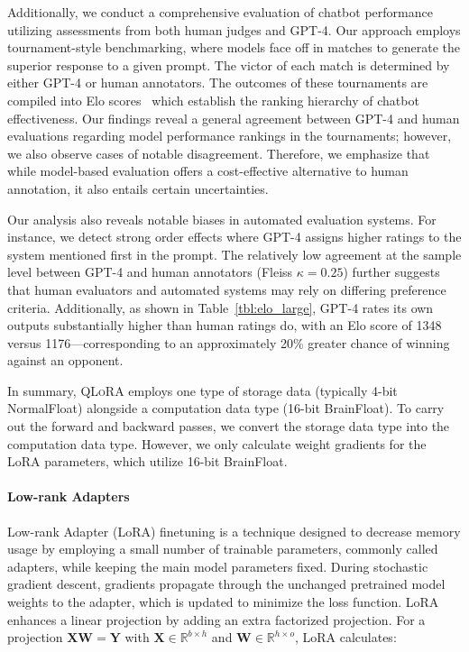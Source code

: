 Additionally, we conduct a comprehensive evaluation of chatbot performance utilizing assessments from both human judges and GPT-4. Our approach employs tournament-style benchmarking, where models face off in matches to generate the superior response to a given prompt. The victor of each match is determined by either GPT-4 or human annotators. The outcomes of these tournaments are compiled into Elo scores~\citep{elo1967proposed, elo1978rating} which establish the ranking hierarchy of chatbot effectiveness. Our findings reveal a general agreement between GPT-4 and human evaluations regarding model performance rankings in the tournaments; however, we also observe cases of notable disagreement. Therefore, we emphasize that while model-based evaluation offers a cost-effective alternative to human annotation, it also entails certain uncertainties.

Our analysis also reveals notable biases in automated evaluation systems. For instance, we detect strong order effects where GPT-4 assigns higher ratings to the system mentioned first in the prompt. The relatively low agreement at the sample level between GPT-4 and human annotators (Fleiss $\kappa=0.25$) further suggests that human evaluators and automated systems may rely on differing preference criteria. Additionally, as shown in Table~\ref{tbl:elo_large}, GPT-4 rates its own outputs substantially higher than human ratings do, with an Elo score of 1348 versus 1176—corresponding to an approximately 20\% greater chance of winning against an opponent.

In summary, \textsc{QLoRA} employs one type of storage data (typically 4-bit NormalFloat) alongside a computation data type (16-bit BrainFloat). To carry out the forward and backward passes, we convert the storage data type into the computation data type. However, we only calculate weight gradients for the LoRA parameters, which utilize 16-bit BrainFloat.

\paragraph{Low-rank Adapters} Low-rank Adapter (LoRA) finetuning \citep{hu2021lora} is a technique designed to decrease memory usage by employing a small number of trainable parameters, commonly called adapters, while keeping the main model parameters fixed. During stochastic gradient descent, gradients propagate through the unchanged pretrained model weights to the adapter, which is updated to minimize the loss function. LoRA enhances a linear projection by adding an extra factorized projection. For a projection ${\mathbf{X} \mathbf{W} = \mathbf{Y}}$ with $\mathbf{X}\in  \mathbb{R}^{b\times h}$ and $\mathbf{W}\in  \mathbb{R}^{h\times o}$, LoRA calculates:

